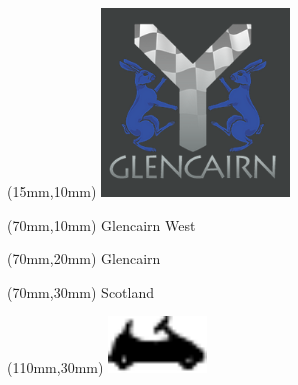 \null\newpage
\begin{textblock*}{50mm}(15mm,10mm)%
\includegraphics[width=50mm]{LG/GLCN.png}
\end{textblock*}
\begin{textblock*}{130mm}(70mm,10mm)%
{\fontsize{20}{20}\selectfont Glencairn West}\\
\end{textblock*}
\begin{textblock*}{120mm}(70mm,20mm)%
{\fontsize{16}{16}\selectfont Glencairn}\\
\end{textblock*}
\begin{textblock*}{120mm}(70mm,30mm)%
{\fontsize{12}{12}\selectfont Scotland}
\end{textblock*}
\begin{textblock*}{30mm}(110mm,30mm)%
\centering
\includegraphics[height=15mm]{icons/kart.pdf}
\end{textblock*}
